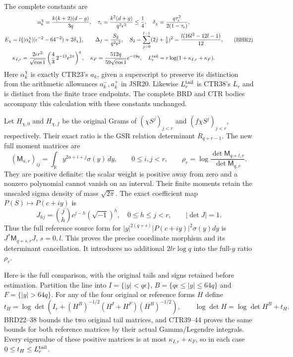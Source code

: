 \documentclass[11pt,a4paper]{article}
\newcommand{\R}{\mathbb R}
\begin{document}
The complete constants are
\[
\begin{gathered}
 \alpha_k^\chi=\frac{k(k+2)(d-g)}{3q},\quad
 \tau_\epsilon=\frac{k^2(d+g)}{q^2\epsilon^2}\leq\frac14,
 \quad\delta_\chi=\frac{q\tau_\epsilon^2}{2(1-\tau_\epsilon)},\\
 E_\chi=l\{ |\alpha_k^\chi|(\epsilon^{-2}-64^{-2})
                                   +2\delta_\chi\},\qquad
 \Delta_f=\frac{S_2}{q^2\epsilon^2},\quad
 S_2=\sum_{j=0}^{l-1}(2j+\tfrac12)^2
       =\frac{l(16l^2-12l-1)}{12},\\
 \kappa_{I,r}=\frac{2\epsilon r^2}{\sqrt{\cos1}}
          \left(\frac43\,2^{-13}e^{2\pi}\right)^q,
 \quad\kappa_F=\frac{512q}{59\sqrt{\cos1}}e^{-19q},\quad
 L_r^{\rm tail}=r\log(1+\kappa_{I,r}+\kappa_F).
\end{gathered}\tag{BHR2}
\]
Here $\alpha_k^\chi$ is exactly CTR23's $a_k$, given a
superscript to preserve its distinction from the arithmetic
allowances $a_k^-,a_k^+$ in JSR20. Likewise
$L_r^{\rm tail}$ is CTR38's $L_r$ and is distinct from
the finite trace endpoints. The complete BRD and CTR bodies
accompany this calculation with these constants unchanged.

Let $H_{\chi,0}$ and $H_{\chi,f}$ be the original Grams of
$(\chi S^j)_{j<r}$ and $(f\chi S^j)_{j<r}$, respectively.
Their exact ratio is the GSR relation determinant
$R_{q+r-1}$. The new full moment matrices are
\[
 (\mathsf M_{a,r})_{ij}
 =\int_{\R}y^{2a+i+j}\sigma(y)\,dy,\qquad
 0\leq i,j<r,\qquad
 \rho_r=\log\frac{\det\mathsf M_{q+l,r}}
                         {\det\mathsf M_{q,r}}.
 \tag{BHR3}
\]
They are positive definite: the scalar weight is positive
away from zero and a nonzero polynomial cannot vanish on
an interval. Their finite moments retain the unscaled
sigma density of mass $\sqrt{2\pi}$.
The exact coefficient map $P(S)\mapsto P(c+iy)$ is
\[
 J_{hj}=\binom jh c^{j-h}(\sqrt{-1})^h,
 \quad 0\leq h\leq j<r,\qquad |\det J|=1.
 \tag{BHR4}
\]
Thus the full reference source form for
$|y|^{2(q+s)}|P(c+iy)|^2\sigma(y)dy$ is
$J^*\mathsf M_{q+s,r}J$, $s=0,l$.
This proves the precise coordinate morphism and its
determinant cancellation. It introduces no additional
$2lr\log q$ into the full-$y$ ratio $\rho_r$.

Here is the full comparison, with the original tails and
signs retained before estimation. Partition the line into
$I=\{|y|<q\epsilon\}$, $B=\{q\epsilon\leq|y|\leq64q\}$
and $F=\{|y|>64q\}$. For any of the four original or
reference forms $H$ define
\[
 t_H=\log\det\!\left(I_r+(H^B)^{-1/2}
                    (H^I+H^F)(H^B)^{-1/2}\right),\qquad
 \log\det H=\log\det H^B+t_H.
 \tag{BHR5}
\]
BRD22--38 bounds the two original tail matrices, and
CTR39--44 proves the same bounds for both reference
matrices by their actual Gamma/Legendre integrals.
Every eigenvalue of these positive matrices is at most
$\kappa_{I,r}+\kappa_F$, so in each case
$0\leq t_H\leq L_r^{\rm tail}$.
\end{document}
